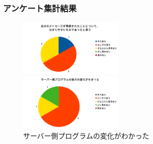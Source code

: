 \documentclass{funthesis}
\begin{document}
\subsubsection{アンケート集計結果}
\begin{figure}[H]
 \begin{minipage}{0.5\hsize}
  \begin{center}
  \includegraphics[width=50mm]{./img/question1.png}
  \end{center}
  \caption{自分のメッセージが発信されたこと\newline についてわかりやすかったと思う}
  \label{question1}
 \end{minipage}
 \begin{minipage}{0.5\hsize}
  \begin{center}
  \includegraphics[width=50mm]{./img/question2.png}
  \end{center}
  \caption{サーバー側プログラムの変化\newline がわかった}
  \label{question2}
  \end{minipage}
  \end{figure}
\end{document}
